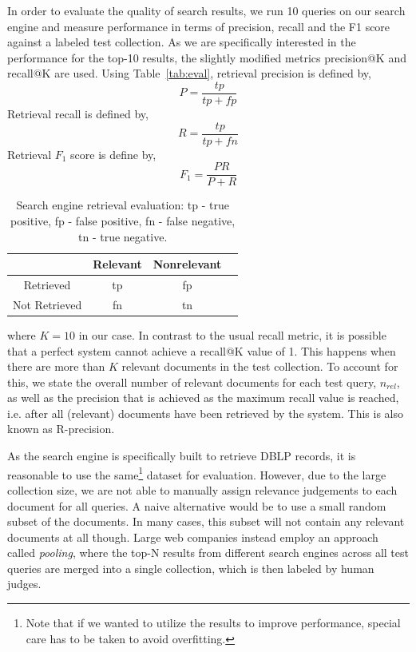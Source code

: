 \documentclass{sig-alternate-05-2015}
\begin{document}
In order to evaluate the quality of search results, we run 10 queries on our search engine and measure performance in terms of precision, recall and the F1 score against a labeled test collection. As we are specifically interested in the performance for the top-10 results, the slightly modified metrics precision@K and recall@K are used. Using Table~\ref{tab:eval}, retrieval precision is defined by, 
\begin{equation}
P=\frac{tp}{tp+fp}
\end{equation}
Retrieval recall is defined by,
\begin{equation}
R=\frac{tp}{tp+fn}
\end{equation}
Retrieval $F_1$ score is define by,
\begin{equation}
F_1=\frac{PR}{P+R}
\end{equation}
\begin{table}\label{tab:eval}
\centering
\caption{Search engine retrieval evaluation: tp - true positive, fp - false positive, fn - false negative, tn - true negative.} \label{tbl:app1}
\begin{tabular}{|c|c|c||c|} \hline
 & Relevant & Nonrelevant\\ \hline
Retrieved & tp & fp \\ \hline
Not Retrieved & fn & tn\\ \hline
\end{tabular}
\end{table}
where $K=10$ in our case. In contrast to the usual recall metric, it is possible that a perfect system cannot achieve a recall@K value of 1. This happens when there are more than $K$ relevant documents in the test collection. To account for this, we state the overall number of relevant documents for each test query, $n_{rel}$, as well as the precision that is achieved as the maximum recall value is reached, i.e. after all (relevant) documents have been retrieved by the system. This is also known as R-precision.

As the search engine is specifically built to retrieve DBLP records, it is reasonable to use the same\footnote{Note that if we wanted to utilize the results to improve performance, special care has to be taken to avoid overfitting.} dataset for evaluation. However, due to the large collection size, we are not able to manually assign relevance judgements to each document for all queries. A naive alternative would be to use a small random subset of the documents. In many cases, this subset will not contain any relevant documents at all though. Large web companies instead employ an approach called \emph{pooling}, where the top-N results from different search engines across all test queries are merged into a single collection, which is then labeled by human judges.  
\end{document}
